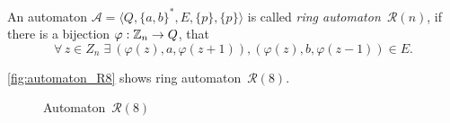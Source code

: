 \section{}

\begin{defn}
    An automaton $\mathcal{A} = \langle Q, {\{a,b\}}^*, E, \{p\}, \{p\} \rangle$ is called \emph{ring automaton~${\mathcal{R}(n)}$}, if there is a bijection $\varphi: \mathbb{Z}_n \to Q$, that
    \[
        \forall \, z \in Z_n \; \exists \: (\varphi(z),a,\varphi(z+1)), (\varphi(z),b,\varphi(z-1)) \in E.
    \]
\end{defn}

\begin{example}
    \autoref*{fig:automaton_R8} shows ring automaton~${\mathcal{R}(8)}$.
\end{example}

\begin{figure}[h]
    \centering
    
    \caption{Automaton~${\mathcal{R}(8)}$}\label{fig:automaton_R8}
\end{figure}